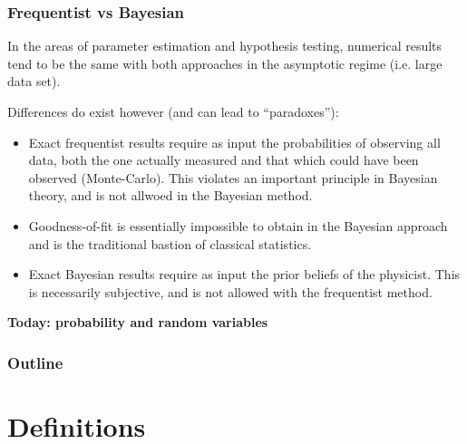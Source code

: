\documentclass[9pt]{beamer}
\begin{document}
\begin{frame}
 \frametitle{Frequentist vs Bayesian}
 
 In the areas of parameter estimation and hypothesis testing, numerical results tend to be the same with both approaches in the asymptotic regime (i.e. large data set).
 
 Differences do exist however (and can lead to ``paradoxes''):
 
 \begin{itemize}
  \item Exact frequentist results require as input the probabilities of observing all data, both the one actually measured and that which could have been observed (Monte-Carlo). This violates an important principle in Bayesian theory, and is not allwoed in the Bayesian method.
  \item Goodness-of-fit is essentially impossible to obtain in the Bayesian approach and is the traditional bastion of classical statistics.
  \item Exact Bayesian results require as input the prior beliefs of the physicist. This is necessarily subjective, and is not allowed with the frequentist method.
 \end{itemize}
 
 

\end{frame}


\begin{frame}[plain]
 \textbf{Today: probability and random variables}
\end{frame}

\begin{frame}[plain]
 \frametitle{Outline}
 
 \tableofcontents
\end{frame}

\section{Definitions}
\end{document}
